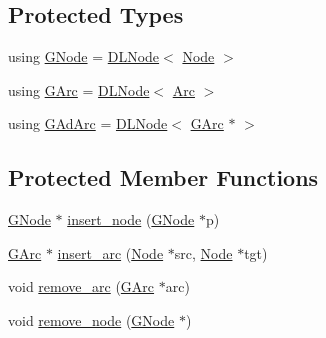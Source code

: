 \subsection*{Protected Types}
\begin{DoxyCompactItemize}
\item 
using \hyperlink{class_designar_1_1_graph_a7e61951db0bb9bfa8a2e317440d4e17f}{G\+Node} = \hyperlink{class_designar_1_1_d_l_node}{D\+L\+Node}$<$ \hyperlink{class_designar_1_1_graph_a5dfc7dba9d092ac489c72e40390c37d0}{Node} $>$
\item 
using \hyperlink{class_designar_1_1_graph_a5ad9e18b71899c2d4979426e367e5573}{G\+Arc} = \hyperlink{class_designar_1_1_d_l_node}{D\+L\+Node}$<$ \hyperlink{class_designar_1_1_graph_a74c730ef4ce2d20f998d72bd25c2b5bf}{Arc} $>$
\item 
using \hyperlink{class_designar_1_1_graph_a7d00558995946c5653522148b54971bc}{G\+Ad\+Arc} = \hyperlink{class_designar_1_1_d_l_node}{D\+L\+Node}$<$ \hyperlink{class_designar_1_1_graph_a5ad9e18b71899c2d4979426e367e5573}{G\+Arc} $\ast$ $>$
\end{DoxyCompactItemize}
\subsection*{Protected Member Functions}
\begin{DoxyCompactItemize}
\item 
\hyperlink{class_designar_1_1_graph_a7e61951db0bb9bfa8a2e317440d4e17f}{G\+Node} $\ast$ \hyperlink{class_designar_1_1_graph_adea7e2c9bb1912cfc7a58990a640355d}{insert\+\_\+node} (\hyperlink{class_designar_1_1_graph_a7e61951db0bb9bfa8a2e317440d4e17f}{G\+Node} $\ast$p)
\item 
\hyperlink{class_designar_1_1_graph_a5ad9e18b71899c2d4979426e367e5573}{G\+Arc} $\ast$ \hyperlink{class_designar_1_1_graph_a20f183a1481fb62bc775aca6bd3244d1}{insert\+\_\+arc} (\hyperlink{class_designar_1_1_graph_a5dfc7dba9d092ac489c72e40390c37d0}{Node} $\ast$src, \hyperlink{class_designar_1_1_graph_a5dfc7dba9d092ac489c72e40390c37d0}{Node} $\ast$tgt)
\item 
void \hyperlink{class_designar_1_1_graph_a00f22c9d1c712f65cc46118e37cf06b9}{remove\+\_\+arc} (\hyperlink{class_designar_1_1_graph_a5ad9e18b71899c2d4979426e367e5573}{G\+Arc} $\ast$arc)
\item 
void \hyperlink{class_designar_1_1_graph_a4ca166ec5729c1402485dc45c040c11c}{remove\+\_\+node} (\hyperlink{class_designar_1_1_graph_a7e61951db0bb9bfa8a2e317440d4e17f}{G\+Node} $\ast$)
\end{DoxyCompactItemize}

